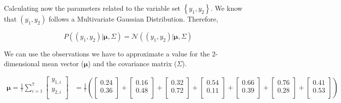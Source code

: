 \documentclass[12pt]{article}
\begin{document}
\begin{enumerate}[leftmargin=\labelsep]
\begin{enumerate}
          Calculating now the parameters related to the variable set $\left\{y_1, y_2\right\}$. We know that $(y_1, y_2)$ follows a Multivariate Gaussian Distribution.
          Therefore,

          \begin{equation}\label{ex1-normal}
              P\left((y_1, y_2) | \boldsymbol{\mu}, \Sigma\right)
              = \mathcal{N}\left((y_1, y_2) | \boldsymbol{\mu}, \Sigma\right)
          \end{equation}

          We can use the observations we have to approximate a value for the
          2-dimensional mean vector ($\boldsymbol{\mu}$) and the covariance matrix ($\Sigma$).

          $$
              \begin{aligned}
                  \boldsymbol{\mu} = \frac{1}{7} \sum^{7}_{i=1} \begin{bmatrix}y_{1,i} \\y_{2,i} \\\end{bmatrix} & =
                      \frac{1}{7}
                      \left(\begin{bmatrix}0.24 \\0.36 \\\end{bmatrix} +
                      \begin{bmatrix}0.16 \\0.48 \\\end{bmatrix} +
                      \begin{bmatrix}0.32 \\0.72 \\\end{bmatrix} +
                      \begin{bmatrix}0.54 \\0.11 \\\end{bmatrix} +
                      \begin{bmatrix}0.66 \\0.39 \\\end{bmatrix} +
                      \begin{bmatrix}0.76 \\0.28 \\\end{bmatrix} +
                      \begin{bmatrix}0.41 \\0.53 \\\end{bmatrix}\right) \\

\end{aligned}$$
\end{enumerate}
\end{enumerate}
\end{document}

